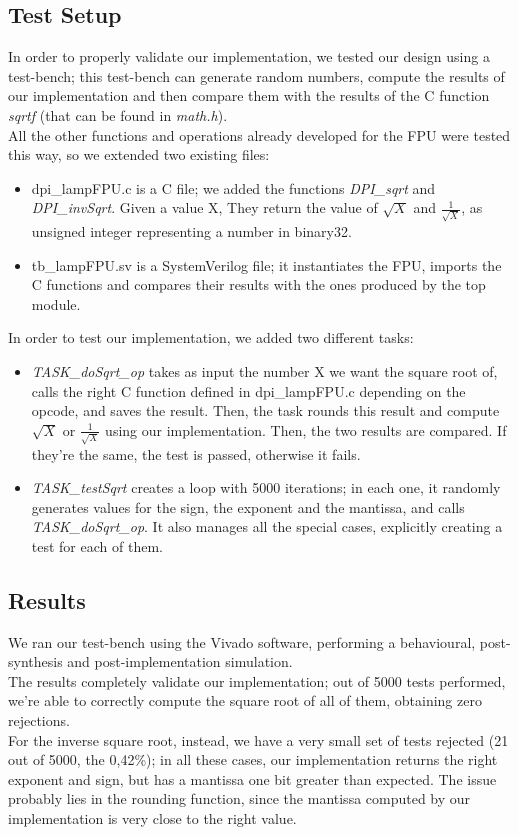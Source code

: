 \subsection{Test Setup}
In order to properly validate our implementation, we tested our design using a test-bench; this test-bench can generate random numbers, compute the results of our implementation and then compare them with the results of the C function \emph{sqrtf} (that can be found in \emph{math.h}).  \\
All the other functions and operations already developed for the FPU were tested this way, so we extended two existing files:
\begin{itemize}
\item dpi\_lampFPU.c is a C file; we added the functions \emph{DPI\_sqrt} and \emph{DPI\_invSqrt}. Given a value X, They return the value of $\sqrt{X}$ and $\frac{1}{\sqrt{X}}$, as unsigned integer representing a number in binary32.
\item tb\_lampFPU.sv is a SystemVerilog file; it instantiates the FPU, imports the C functions and compares their results with the ones produced by the top module. 
\end{itemize}

In order to test our implementation, we added two different tasks:
\begin{itemize}
\item \emph{TASK\_doSqrt\_op} takes as input the number X we want the square root of, calls the right C function defined in dpi\_lampFPU.c depending on the opcode, and saves the result. Then, the task rounds this result and compute $\sqrt{X}$ or $\frac{1}{\sqrt{X}}$ using our implementation. Then, the two results are compared. If they're the same, the test is passed, otherwise it fails. 
\item \emph{TASK\_testSqrt} creates a loop with 5000 iterations; in each one, it randomly generates values for the sign, the exponent and the mantissa, and calls \emph{TASK\_doSqrt\_op}. It also manages all the special cases, explicitly creating a test for each of them. 
\end{itemize}

\subsection{Results}
We ran our test-bench using the Vivado software, performing a behavioural, post-synthesis and post-implementation simulation.\\
The results completely validate our implementation; out of 5000 tests performed, we're able to correctly compute the square root of all of them, obtaining zero rejections. \\
For the inverse square root, instead, we have a very small set of tests rejected (21 out of 5000, the 0,42\%); in all these cases, our implementation returns the right exponent and sign, but has a mantissa one bit greater than expected. The issue probably lies in the rounding function, since the mantissa computed by our implementation is very close to the right value.  

